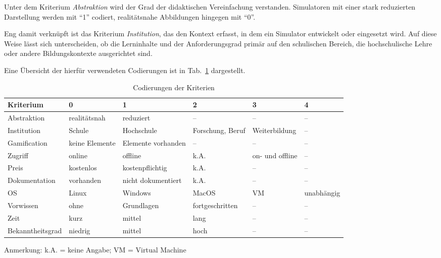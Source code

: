 Unter dem Kriterium \textit{Abstraktion} wird der Grad der didaktischen Vereinfachung verstanden. Simulatoren mit einer stark reduzierten Darstellung werden mit \enquote{1} codiert, realitätsnahe Abbildungen hingegen mit \enquote{0}. 

Eng damit verknüpft ist das Kriterium \textit{Institution}, das den Kontext erfasst, in dem ein Simulator entwickelt oder eingesetzt wird. Auf diese Weise lässt sich unterscheiden, ob die Lerninhalte und der Anforderungsgrad primär auf den schulischen Bereich, die hochschulische Lehre oder andere Bildungskontexte ausgerichtet sind.

Eine Übersicht der hierfür verwendeten Codierungen ist in Tab.~\ref{tab:legende_codierung} dargestellt.

\begin{table}[h]
  \centering
  \caption{Codierungen der Kriterien}
  \label{tab:legende_codierung}
  \tiny
  \begin{tabularx}{\textwidth}{p{2cm}p{1.5cm}p{1.7cm}p{1.7cm}p{1.5cm}p{1.5cm}}
    \toprule
    \textbf{Kriterium} & \textbf{0} & \textbf{1} & \textbf{2} & \textbf{3} & \textbf{4} \\
    \midrule
    Abstraktion       & realitätsnah & reduziert & -- & -- & -- \\
    Institution       & Schule & Hochschule & Forschung, Beruf & Weiterbildung & -- \\
    Gamification      & keine Elemente & Elemente vorhanden & -- & -- & -- \\
    Zugriff           & online & offline & k.A. & on- und offline & -- \\
    Preis             & kostenlos & kostenpflichtig & k.A. & -- & -- \\
    Dokumentation     & vorhanden & nicht dokumentiert & k.A. & -- & -- \\
    OS                & Linux & Windows & MacOS & VM & unabhängig \\
    Vorwissen         & ohne & Grundlagen & fortgeschritten & -- & -- \\
    Zeit & kurz & mittel & lang & -- & -- \\
    Bekanntheitsgrad  & niedrig & mittel & hoch & -- & -- \\
    \bottomrule
  \end{tabularx}
  \vspace{0.5em}
  {\tiny Anmerkung: k.A. = keine Angabe; VM = Virtual Machine}
\end{table}

